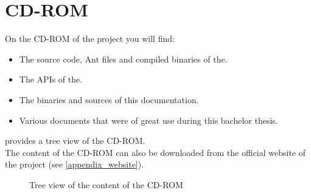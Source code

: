 \chapter{CD-ROM}\label{cdrom}
On the CD-ROM  of the project you will find:
\begin{itemize}
\item The source code, Ant files and compiled binaries of the.
\item The APIs of the.
\item The binaries and sources of this documentation.
\item Various documents that were of great use during this bachelor thesis.
\end{itemize} 
 provides a tree view of the CD-ROM.\\
The content of the CD-ROM can also be downloaded from the official website of the project (see \ref{appendix_website}).

\begin{figure}
   \centering
   \caption{Tree view of the content of the CD-ROM}
   \label{tree_view}
\end{figure}

